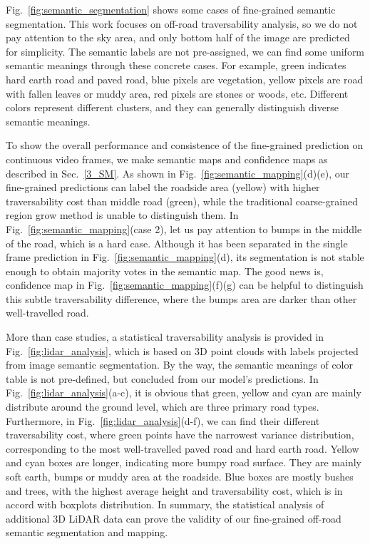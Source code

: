 \documentclass[letterpaper, 10 pt, conference]{ieeeconf}  %
\begin{document}
Fig.~\ref{fig:semantic_segmentation} shows some cases of fine-grained semantic segmentation. This work focuses on off-road traversability analysis, so we do not pay attention to the sky area, and only bottom half of the image are predicted for simplicity. The semantic labels are not pre-assigned, we can find some uniform semantic meanings through these concrete cases. For example, green indicates hard earth road and paved road, blue pixels are vegetation, yellow pixels are road with fallen leaves or muddy area, red pixels are stones or woods, etc. Different colors represent different clusters, and they can generally distinguish diverse semantic meanings.

To show the overall performance and consistence of the fine-grained prediction on continuous video frames, we make semantic maps and confidence maps as described in Sec.~\ref{3_SM}. As shown in Fig.~\ref{fig:semantic_mapping}(d)(e), our fine-grained predictions can label the roadside area (yellow) with higher traversability cost than middle road (green), while the traditional coarse-grained region grow method is unable to distinguish them. In Fig.~\ref{fig:semantic_mapping}(case 2), let us pay attention to bumps in the middle of the road, which is a hard case. Although it has been separated in the single frame prediction in Fig.~\ref{fig:semantic_mapping}(d), its segmentation is not stable enough to obtain majority votes in the semantic map. The good news is, confidence map in Fig.~\ref{fig:semantic_mapping}(f)(g) can be helpful to distinguish this subtle traversability difference, where the bumps area are darker than other well-travelled road.

More than case studies, a statistical traversability analysis is provided in Fig.~\ref{fig:lidar_analysis}, which is based on 3D point clouds with labels projected from image semantic segmentation. By the way, the semantic meanings of color table is not pre-defined, but concluded from our model's predictions.
In Fig.~\ref{fig:lidar_analysis}(a-c), it is obvious that green, yellow and cyan are mainly distribute around the ground level, which are three primary road types. Furthermore, in Fig.~\ref{fig:lidar_analysis}(d-f), we can find their different traversability cost, where green points have the narrowest variance distribution, corresponding to the most well-travelled paved road and hard earth road. Yellow and cyan boxes are longer, indicating more bumpy road surface. They are mainly soft earth, bumps or muddy area at the roadside. Blue boxes are mostly bushes and trees, with the highest average height and traversability cost, which is in accord with boxplots distribution. In summary, the statistical analysis of additional 3D LiDAR data can prove the validity of our fine-grained off-road semantic segmentation and mapping.
\end{document}
